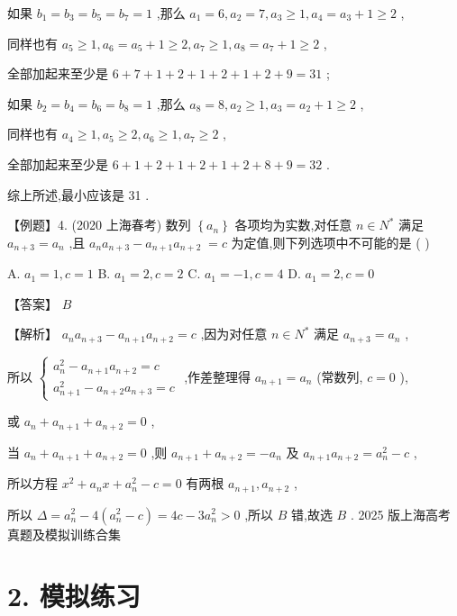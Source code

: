 \documentclass[10pt]{article}
\begin{document}
如果 \({b}_{1} = {b}_{3} = {b}_{5} = {b}_{7} = 1\) ,那么 \({a}_{1} = 6,{a}_{2} = 7,{a}_{3} \geq  1,{a}_{4} = {a}_{3} + 1 \geq  2\) ,

同样也有 \({a}_{5} \geq  1,{a}_{6} = {a}_{5} + 1 \geq  2,{a}_{7} \geq  1,{a}_{8} = {a}_{7} + 1 \geq  2\) ,

全部加起来至少是 \(6 + 7 + 1 + 2 + 1 + 2 + 1 + 2 + 9 = {31}\) ;

如果 \({b}_{2} = {b}_{4} = {b}_{6} = {b}_{8} = 1\) ,那么 \({a}_{8} = 8,{a}_{2} \geq  1,{a}_{3} = {a}_{2} + 1 \geq  2\) ,

同样也有 \({a}_{4} \geq  1,{a}_{5} \geq  2,{a}_{6} \geq  1,{a}_{7} \geq  2\) ,

全部加起来至少是 \(6 + 1 + 2 + 1 + 2 + 1 + 2 + 8 + 9 = {32}\) .

综上所述,最小应该是 31 .

【例题】4. (2020 上海春考) 数列 \(\left\{  {a}_{n}\right\}\) 各项均为实数,对任意 \(n \in  {N}^{ * }\) 满足 \({a}_{n + 3} = {a}_{n}\) ,且 \({a}_{n}{a}_{n + 3} - {a}_{n + 1}{a}_{n + 2} \; = c\) 为定值,则下列选项中不可能的是 ( )

A. \({a}_{1} = 1,c = 1\) B. \({a}_{1} = 2,c = 2\) C. \({a}_{1} =  - 1,c = 4\) D. \({a}_{1} = 2,c = 0\)

【答案】 \(B\)

【解析】 \({a}_{n}{a}_{n + 3} - {a}_{n + 1}{a}_{n + 2} = c\) ,因为对任意 \(n \in  {N}^{ * }\) 满足 \({a}_{n + 3} = {a}_{n}\) ,

所以 \(\left\{  \begin{array}{l} {a}_{n}^{2} - {a}_{n + 1}{a}_{n + 2} = c \\  {a}_{n + 1}^{2} - {a}_{n + 2}{a}_{n + 3} = c \end{array}\right.\) ,作差整理得 \({a}_{n + 1} = {a}_{n}\) (常数列, \(c = 0\) ),

或 \({a}_{n} + {a}_{n + 1} + {a}_{n + 2} = 0\) ,

当 \({a}_{n} + {a}_{n + 1} + {a}_{n + 2} = 0\) ,则 \({a}_{n + 1} + {a}_{n + 2} =  - {a}_{n}\) 及 \({a}_{n + 1}{a}_{n + 2} = {a}_{n}^{2} - c\) ,

所以方程 \({x}^{2} + {a}_{n}x + {a}_{n}^{2} - c = 0\) 有两根 \({a}_{n + 1},{a}_{n + 2}\) ,

所以 \(\Delta  = {a}_{n}^{2} - 4\left( {{a}_{n}^{2} - c}\right)  = {4c} - 3{a}_{n}^{2} > 0\) ,所以 \(B\) 错,故选 \(B\) . 2025 版上海高考真题及模拟训练合集

\section*{2. 模拟练习}
\end{document}
